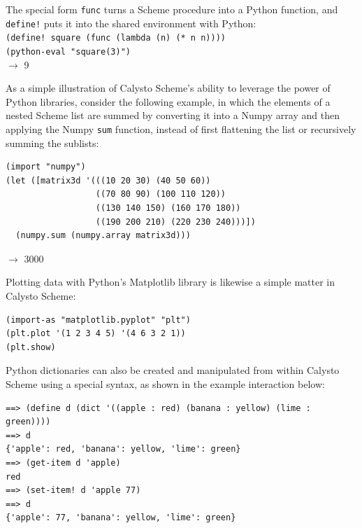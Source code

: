 \documentclass[acmsmall,screen,authorversion]{acmart}
\begin{document}
\noindent
The special form \texttt{func} turns a Scheme procedure into a Python function,
and \texttt{define!} puts it into the shared environment with Python:\\

{\small
\noindent
\texttt{(define! square (func (lambda (n) (* n n))))}\\
\texttt{(python-eval "square(3)")}\\
$\rightarrow$ 9\\
}

\noindent
As a simple illustration of Calysto Scheme's ability to leverage the power of
Python libraries, consider the following example, in which the elements of a
nested Scheme list are summed by converting it into a Numpy array and then
applying the Numpy \texttt{sum} function, instead of first flattening the list
or recursively summing the sublists:\\

\noindent
\begin{minipage}{\textwidth}
{\small
\begin{verbatim}
(import "numpy")
(let ([matrix3d '(((10 20 30) (40 50 60))
                  ((70 80 90) (100 110 120))
                  ((130 140 150) (160 170 180))
                  ((190 200 210) (220 230 240)))])
  (numpy.sum (numpy.array matrix3d)))
\end{verbatim}
$\rightarrow$ 3000\\
}
\end{minipage}

\noindent
Plotting data with Python's Matplotlib library is likewise a simple matter in
Calysto Scheme:\\

{\small
\begin{verbatim}
(import-as "matplotlib.pyplot" "plt")
(plt.plot '(1 2 3 4 5) '(4 6 3 2 1))
(plt.show)

\end{verbatim}
}

\noindent
Python dictionaries can also be created and manipulated from within Calysto
Scheme using a special syntax, as shown in the example interaction below:\\

\noindent
\begin{minipage}{\textwidth}
{\small
\begin{verbatim}
==> (define d (dict '((apple : red) (banana : yellow) (lime : green))))
==> d
{'apple': red, 'banana': yellow, 'lime': green}
==> (get-item d 'apple)
red
==> (set-item! d 'apple 77)
==> d
{'apple': 77, 'banana': yellow, 'lime': green}
\end{verbatim}
}
\end{minipage}
\end{document}
